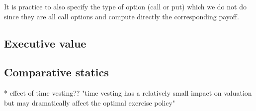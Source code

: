     It is practice to also specify the type of option (call or put) which we do not do since they are all call options and compute directly the corresponding payoff.







\subsection{Executive value}







\subsection{Comparative statics}




* effect of time vesting?? "time vesting has a relatively small impact on valuation but may dramatically affect the optimal exercise policy" \cite{dybvig2003employee}